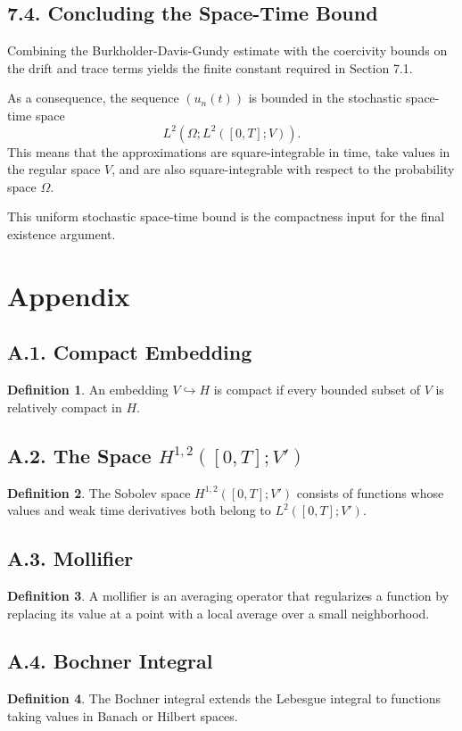 \documentclass[11pt]{article}
\theoremstyle{definition}
\newtheorem{definition}{Definition}
\theoremstyle{remark}
\begin{document}
\subsection*{7.4. Concluding the Space-Time Bound}
Combining the Burkholder-Davis-Gundy estimate with the coercivity bounds on the drift and trace terms yields the finite constant required in Section 7.1.

As a consequence, the sequence \((u_n(t))\) is bounded in the stochastic space-time space
\[
L^2(\Omega;L^2([0,T];V)).
\]
This means that the approximations are square-integrable in time, take values in the regular space \(V\), and are also square-integrable with respect to the probability space \(\Omega\).

This uniform stochastic space-time bound is the compactness input for the final existence argument.

\section*{Appendix}

\subsection*{A.1. Compact Embedding}
\begin{definition}
An embedding \(V\hookrightarrow H\) is compact if every bounded subset of \(V\) is relatively compact in \(H\).
\end{definition}

\subsection*{A.2. The Space \(H^{1,2}([0,T];V')\)}
\begin{definition}
The Sobolev space \(H^{1,2}([0,T];V')\) consists of functions whose values and weak time derivatives both belong to \(L^2([0,T];V')\).
\end{definition}

\subsection*{A.3. Mollifier}
\begin{definition}
A mollifier is an averaging operator that regularizes a function by replacing its value at a point with a local average over a small neighborhood.
\end{definition}

\subsection*{A.4. Bochner Integral}
\begin{definition}
The Bochner integral extends the Lebesgue integral to functions taking values in Banach or Hilbert spaces.
\end{definition}
\end{document}
